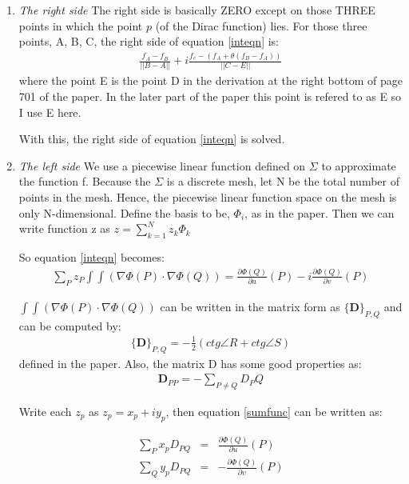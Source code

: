 \documentclass{InsightArticle}
\begin{document}
  \begin{enumerate}
  \item \emph{The right side} The right side is basically ZERO
    except on those THREE points in which the point $p$ (of the Dirac
    function) lies. For those three points, A, B, C, the right side of
    equation \ref{inteqn} is:
    \begin{eqnarray}
      \frac{f_A - f_B}{|| B - A ||} + i\frac{f_c-(f_A + \theta(f_B -
        f_A))}{||C - E||} \label{Rinteqn}
    \end{eqnarray}  
    where the point E is the point D in the derivation at the right
    bottom of page 701 of the paper. In the later part of the paper this
    point is refered to as E so I use E here.

    With this, the right side of equation \ref{inteqn} is solved.

  \item \emph{The left side} We use a piecewise linear function
    defined on $\Sigma$ to approximate the function f. Because the
    $\Sigma$ is a discrete mesh, let N be the total number of points
    in the mesh. Hence, the piecewise linear function space on the
    mesh is only N-dimensional. Define the basis to be, $\Phi_i$, as in the
    paper. Then we can write function z as $z = \sum_{k=1}^{N}z_k
    \Phi_k$

    So equation \ref{inteqn} becomes:
    \begin{eqnarray}
      \sum_{P}z_P \int\int (\nabla \Phi(P) \cdot \nabla \Phi(Q)) =
      \frac{\partial \Phi(Q)}{\partial u}(P) - i\frac{\partial
        \Phi(Q)}{\partial v} (P) \label{sumfunc}   
    \end{eqnarray}  
    
    $\int\int (\nabla \Phi(P) \cdot \nabla \Phi(Q))$ can be written in
    the matrix form as $\{ \mathbf{D} \}_{P,Q }$ and can be computed by:
    \begin{eqnarray}
      \{ \mathbf{D} \}_{P,Q } = -\frac{1}{2}(ctg\angle R + ctg\angle S)
      \label{ctg}
    \end{eqnarray}
    defined in the paper. Also, the matrix D has some good properties as:
    \begin{eqnarray}
      \mathbf{D}_{PP} = -\sum_{P \ne Q}D_PQ \label{prop}
    \end{eqnarray}


    Write each $z_p$ as $z_p=x_p + iy_p$, then
    equation \ref{sumfunc} can be written as:

    \begin{eqnarray}
      \sum_{P}x_p D_{PQ} &=& \frac{\partial \Phi(Q)}{\partial u}(P) \nonumber\\
      \sum_{Q}y_p D_{PQ} &=& -\frac{\partial \Phi(Q)}{\partial v} (P)
    \end{eqnarray}  


\end{enumerate}
\end{document}

